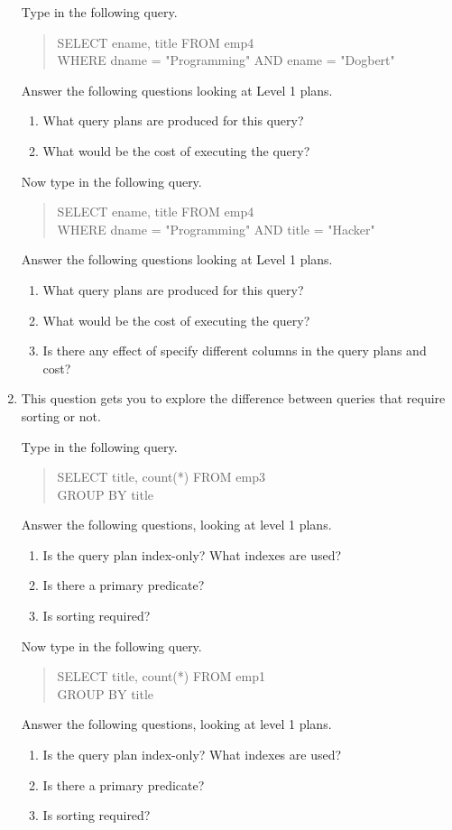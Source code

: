 \begin{enumerate}
Type in the following query.
\begin{quote}
        SELECT ename, title FROM emp4\\
        WHERE dname = "Programming" AND ename = "Dogbert"
\end{quote}

Answer the following questions looking at Level 1 plans.
\begin{enumerate}
\item
What query plans are produced for this query?
\item
What would be the cost of executing the query?
\end{enumerate}

Now type in the following query.
\begin{quote}
        SELECT ename, title FROM emp4\\
        WHERE dname = "Programming" AND title = "Hacker"
\end{quote}

Answer the following questions looking at Level 1 plans.
\begin{enumerate}
\item
What query plans are produced for this query?
\item
What would be the cost of executing the query?
\item
Is there any effect of specify different columns in the query plans
and cost?
\end{enumerate}


\item

This question gets you to explore the difference between queries that
require sorting or not.

Type in the following query.
\begin{quote}
        SELECT title, count(*) FROM emp3\\
        GROUP BY title
\end{quote}

Answer the following questions, looking at level 1 plans.
\begin{enumerate}
\item
Is the query plan index-only?  What indexes are used?
\item
Is there a primary predicate?
\item
Is sorting required?
\end{enumerate}

Now type in the following query.
\begin{quote}
        SELECT title, count(*) FROM emp1\\
        GROUP BY title
\end{quote}

Answer the following questions, looking at level 1 plans.
\begin{enumerate}
\item
Is the query plan index-only?  What indexes are used?
\item
Is there a primary predicate?
\item
Is sorting required?
\end{enumerate}

\end{enumerate}

